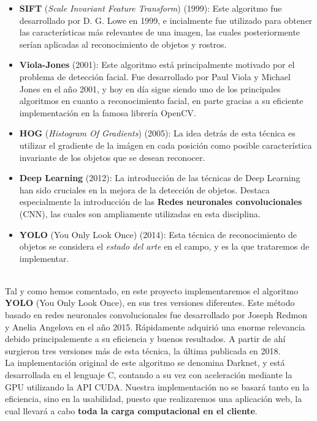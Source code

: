 \documentclass[a4paper]{article}
\begin{document}
\begin{itemize}
    \item \textbf{SIFT} (\textit{Scale Invariant Feature Transform}) (1999): Este algoritmo fue 
    desarrollado por D. G. Lowe en 1999, e incialmente fue utilizado para obtener las características 
    más relevantes de una imagen, las cuales posteriormente serían aplicadas al reconocimiento de 
    objetos y rostros.
    \item \textbf{Viola-Jones} (2001): Este algoritmo está principalmente motivado por el problema de 
    detección facial. Fue desarrollado por Paul Viola y Michael Jones en el año 2001, y hoy en día sigue siendo uno de los principales algoritmos en cuanto a reconocimiento facial, en parte gracias a su eficiente implementación en la famosa librería OpenCV. 
    \item \textbf{HOG} (\textit{Histogram Of Gradients}) (2005): La idea detrás de esta técnica es 
    utilizar el gradiente de la imágen en cada posición como posible característica invariante de los 
    objetos que se desean reconocer.
    \item \textbf{Deep Learning} (2012): La introducción de las técnicas de Deep Learning han sido cruciales en la mejora de la detección de objetos. Destaca especialmente la introducción de las 
    \textbf{Redes neuronales convolucionales} (CNN), las cuales son ampliamente utilizadas en esta 
    disciplina.
    \item \textbf{YOLO} (You Only Look Once) (2014): Esta técnica de reconocimiento de objetos se 
    considera el \textit{estado del arte} en el campo, y es la que trataremos de implementar.
\end{itemize}
\\
Tal y como hemos comentado, en este proyecto implementaremos el algoritmo \textbf{YOLO} (You Only Look
Once), en sus tres versiones diferentes. Este método basado en redes neuronales convolucionales fue 
desarrollado por Joseph Redmon y Anelia Angelova en el año 2015. Rápidamente adquirió una enorme 
relevancia debido principalemente a su eficiencia y buenos resultados. A partir de ahí surgieron tres 
versiones más de esta técnica, la última publicada en 2018.\\

La implementación original de este algoritmo se denomina Darknet, y está desarrollada en el lenguaje 
C, contando a su vez con aceleración mediante la GPU utilizando la API CUDA. Nuestra implementación no
se basará tanto en la eficiencia, sino en la usabilidad, puesto que realizaremos una aplicación web, la cual llevará a cabo \textbf{toda la carga computacional en el cliente}.\\
\end{document}
